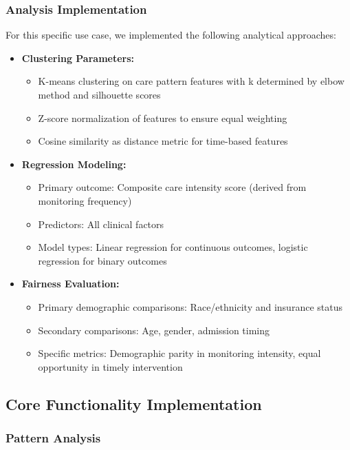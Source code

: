 \documentclass[12pt]{article}
\begin{document}
\subsubsection{Analysis Implementation}

For this specific use case, we implemented the following analytical approaches:

\begin{itemize}
    \item \textbf{Clustering Parameters:}
    \begin{itemize}
        \item K-means clustering on care pattern features with k determined by elbow method and silhouette scores
        \item Z-score normalization of features to ensure equal weighting
        \item Cosine similarity as distance metric for time-based features
    \end{itemize}
    \item \textbf{Regression Modeling:}
    \begin{itemize}
        \item Primary outcome: Composite care intensity score (derived from monitoring frequency)
        \item Predictors: All clinical factors
        \item Model types: Linear regression for continuous outcomes, logistic regression for binary outcomes
    \end{itemize}
    \item \textbf{Fairness Evaluation:}
    \begin{itemize}
        \item Primary demographic comparisons: Race/ethnicity and insurance status
        \item Secondary comparisons: Age, gender, admission timing
        \item Specific metrics: Demographic parity in monitoring intensity, equal opportunity in timely intervention
    \end{itemize}
\end{itemize}

\subsection{Core Functionality Implementation}

\subsubsection{Pattern Analysis}
\end{document}
